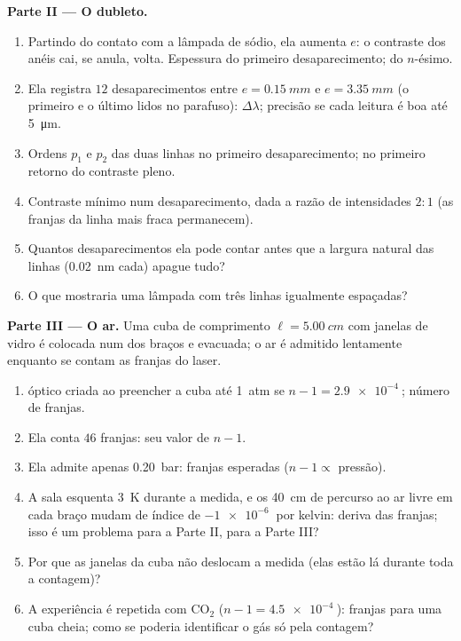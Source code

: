 \begin{problem}
\medskip
\noindent\textbf{Parte II --- O dubleto.}
\begin{enumerate}[resume]
  \item Partindo do contato com a lâmpada de sódio, ela aumenta $e$:
        o contraste dos anéis cai, se anula, volta. Espessura do
        primeiro desaparecimento; do $n$-ésimo.
  \item Ela registra $12$ desaparecimentos entre $e = \qty{0.15}{mm}$ e
        $e = \qty{3.35}{mm}$ (o primeiro e o último lidos no parafuso):
        $\Delta\lambda$; precisão se cada leitura é boa até \qty{5}{\micro m}.
  \item Ordens $p_1$ e $p_2$ das duas linhas no primeiro
        desaparecimento; no primeiro retorno do contraste pleno.
  \item Contraste mínimo num desaparecimento, dada a razão de
        intensidades $2 : 1$ (as franjas da linha mais fraca permanecem).
  \item Quantos desaparecimentos ela pode contar antes que a largura natural
        das linhas (\qty{0.02}{nm} cada) apague tudo?
  \item O que mostraria uma lâmpada com três linhas igualmente espaçadas?
\end{enumerate}

\medskip
\noindent\textbf{Parte III --- O ar.}
Uma cuba de comprimento $\ell = \qty{5.00}{cm}$ com janelas de vidro é colocada num dos
braços e evacuada; o ar é admitido lentamente enquanto se contam as franjas
do laser.
\begin{enumerate}[resume]
  \item {} óptico criada ao preencher a cuba até
        \qty{1}{atm} se $n - 1 = \qty{2.9e-4}{}$; número de franjas.
  \item Ela conta $46$ franjas: seu valor de $n - 1$.
  \item Ela admite apenas \qty{0.20}{bar}: franjas esperadas ($n - 1 \propto$
        pressão).
  \item A sala esquenta \qty{3}{K} durante a medida, e os
        \qty{40}{cm} de percurso ao ar livre em cada braço mudam de índice de
        $-\qty{1e-6}{}$ por kelvin: deriva das franjas; isso é um problema para a
        Parte II, para a Parte III?
  \item Por que as janelas da cuba não deslocam a medida (elas estão
        lá durante toda a contagem)?
  \item A experiência é repetida com CO$_2$ ($n - 1 = \qty{4.5e-4}{}$):
        franjas para uma cuba cheia; como se poderia identificar o gás só
        pela contagem?
\end{enumerate}


\end{problem}
